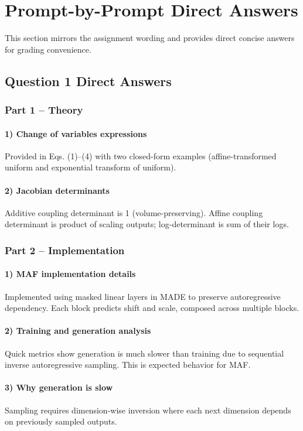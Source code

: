 \documentclass[conference]{IEEEtran}
\begin{document}
\section{Prompt-by-Prompt Direct Answers}
This section mirrors the assignment wording and provides direct concise answers for grading convenience.

\subsection{Question 1 Direct Answers}
\subsubsection{Part 1 -- Theory}
\paragraph{1) Change of variables expressions}
Provided in Eqs. (1)--(4) with two closed-form examples (affine-transformed uniform and exponential transform of uniform).

\paragraph{2) Jacobian determinants}
Additive coupling determinant is 1 (volume-preserving). Affine coupling determinant is product of scaling outputs; log-determinant is sum of their logs.

\subsubsection{Part 2 -- Implementation}
\paragraph{1) MAF implementation details}
Implemented using masked linear layers in MADE to preserve autoregressive dependency. Each block predicts shift and scale, composed across multiple blocks.

\paragraph{2) Training and generation analysis}
Quick metrics show generation is much slower than training due to sequential inverse autoregressive sampling. This is expected behavior for MAF.

\paragraph{3) Why generation is slow}
Sampling requires dimension-wise inversion where each next dimension depends on previously sampled outputs.
\end{document}
